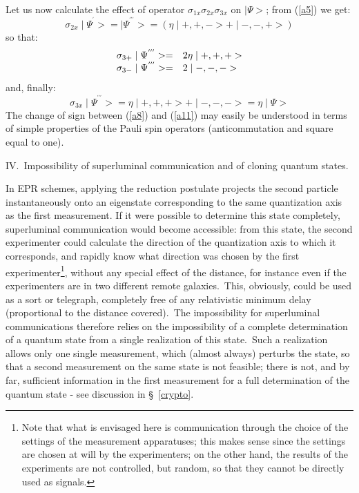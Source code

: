 \documentclass[12pt,onecolumn]{article}%
\begin{document}
Let us now calculate the effect of operator $\sigma_{1x}\sigma_{2x}\sigma
_{3x}$ on $\mid\Psi>$; from (\ref{a5}) we get:
\begin{equation}
\sigma_{2x}\mid\Psi^{^{\prime}}>=\mid\Psi^{^{\prime\prime\prime}}>=\left(
\eta\mid+,+,->+\mid-,-,+>\right)  \label{a9}%
\end{equation}
so that:
\begin{equation}%
\begin{array}
[c]{ll}%
\sigma_{3+}\mid\Psi^{^{\prime\prime\prime}}>= & 2\eta\mid+,+,+>\\
\sigma_{3-}\mid\Psi^{^{\prime\prime\prime}}>= & 2\mid-,-,->
\end{array}
\label{a10}%
\end{equation}
and, finally:
\begin{equation}
\sigma_{3x}\mid\Psi^{^{\prime\prime\prime}}>=\eta\mid+,+,+>+\mid
-,-,->=\eta\mid\Psi> \label{a11}%
\end{equation}
The change of sign between (\ref{a8}) and (\ref{a11}) may easily be understood
in terms of simple properties of the Pauli spin operators (anticommutation and
square equal to one).

\begin{center}
\bigskip\bigskip

\bigskip\bigskip IV.\ Impossibility of superluminal communication and of
cloning quantum states.
\end{center}

In EPR schemes, applying the reduction postulate projects the second particle
instantaneously onto an eigenstate corresponding to the same quantization axis
as the first measurement. If it were possible to determine this state
completely, superluminal communication would become accessible: from this
state, the second experimenter could calculate the direction of the
quantization axis to which it corresponds, and rapidly know what direction was
chosen by the first experimenter\footnote{Note that what is envisaged here is
communication through the choice of the settings of the measurement
apparatuses; this makes sense since the settings are chosen at will by the
experimenters; on the other hand, the results of the experiments are not
controlled, but random, so that they cannot be directly used as signals.},
without any special effect of the distance, for instance even if the
experimenters are in two different remote galaxies.\ This, obviously, could be
used as a sort or telegraph, completely free of any relativistic minimum delay
(proportional to the distance covered).\ The impossibility for superluminal
communications therefore relies on the impossibility of a complete
determination of a quantum state from a single realization of this
state.\ Such a realization allows only one single measurement, which (almost
always) perturbs the state, so that a second measurement on the same state is
not feasible; there is not, and by far, sufficient information in the first
measurement for a full determination of the quantum state - see discussion in
\S \ \ref{crypto}.
\end{document}
